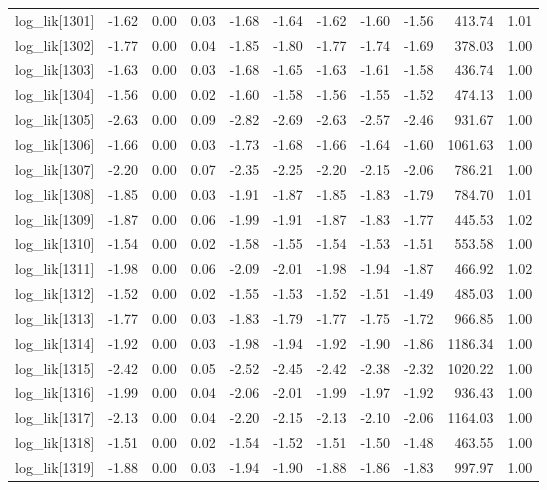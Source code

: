 \begin{table}[ht]
\begin{tabular}{rrrrrrrrrrr}
  log\_lik[1301] & -1.62 & 0.00 & 0.03 & -1.68 & -1.64 & -1.62 & -1.60 & -1.56 & 413.74 & 1.01 \\ 
  log\_lik[1302] & -1.77 & 0.00 & 0.04 & -1.85 & -1.80 & -1.77 & -1.74 & -1.69 & 378.03 & 1.00 \\ 
  log\_lik[1303] & -1.63 & 0.00 & 0.03 & -1.68 & -1.65 & -1.63 & -1.61 & -1.58 & 436.74 & 1.00 \\ 
  log\_lik[1304] & -1.56 & 0.00 & 0.02 & -1.60 & -1.58 & -1.56 & -1.55 & -1.52 & 474.13 & 1.00 \\ 
  log\_lik[1305] & -2.63 & 0.00 & 0.09 & -2.82 & -2.69 & -2.63 & -2.57 & -2.46 & 931.67 & 1.00 \\ 
  log\_lik[1306] & -1.66 & 0.00 & 0.03 & -1.73 & -1.68 & -1.66 & -1.64 & -1.60 & 1061.63 & 1.00 \\ 
  log\_lik[1307] & -2.20 & 0.00 & 0.07 & -2.35 & -2.25 & -2.20 & -2.15 & -2.06 & 786.21 & 1.00 \\ 
  log\_lik[1308] & -1.85 & 0.00 & 0.03 & -1.91 & -1.87 & -1.85 & -1.83 & -1.79 & 784.70 & 1.01 \\ 
  log\_lik[1309] & -1.87 & 0.00 & 0.06 & -1.99 & -1.91 & -1.87 & -1.83 & -1.77 & 445.53 & 1.02 \\ 
  log\_lik[1310] & -1.54 & 0.00 & 0.02 & -1.58 & -1.55 & -1.54 & -1.53 & -1.51 & 553.58 & 1.00 \\ 
  log\_lik[1311] & -1.98 & 0.00 & 0.06 & -2.09 & -2.01 & -1.98 & -1.94 & -1.87 & 466.92 & 1.02 \\ 
  log\_lik[1312] & -1.52 & 0.00 & 0.02 & -1.55 & -1.53 & -1.52 & -1.51 & -1.49 & 485.03 & 1.00 \\ 
  log\_lik[1313] & -1.77 & 0.00 & 0.03 & -1.83 & -1.79 & -1.77 & -1.75 & -1.72 & 966.85 & 1.00 \\ 
  log\_lik[1314] & -1.92 & 0.00 & 0.03 & -1.98 & -1.94 & -1.92 & -1.90 & -1.86 & 1186.34 & 1.00 \\ 
  log\_lik[1315] & -2.42 & 0.00 & 0.05 & -2.52 & -2.45 & -2.42 & -2.38 & -2.32 & 1020.22 & 1.00 \\ 
  log\_lik[1316] & -1.99 & 0.00 & 0.04 & -2.06 & -2.01 & -1.99 & -1.97 & -1.92 & 936.43 & 1.00 \\ 
  log\_lik[1317] & -2.13 & 0.00 & 0.04 & -2.20 & -2.15 & -2.13 & -2.10 & -2.06 & 1164.03 & 1.00 \\ 
  log\_lik[1318] & -1.51 & 0.00 & 0.02 & -1.54 & -1.52 & -1.51 & -1.50 & -1.48 & 463.55 & 1.00 \\ 
  log\_lik[1319] & -1.88 & 0.00 & 0.03 & -1.94 & -1.90 & -1.88 & -1.86 & -1.83 & 997.97 & 1.00 \\ 

\end{tabular}
\end{table}
